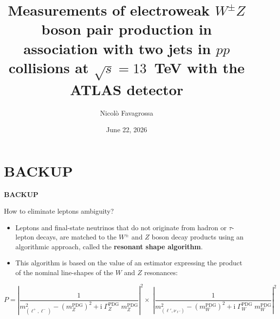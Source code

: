 \documentclass{beamer}
\title{\normalsize Measurements of electroweak $W^{\pm}Z$  boson pair production in association with two jets in $pp$ collisions at $\sqrt{s} = 13$~TeV with the ATLAS detector\\}
\author{Nicolò Favagrossa}
\date{June 22, 2026}
\begin{document}
\maketitle
    




\backmatter
\appendix
\section*{BACKUP}
\begin{frame}[noframenumbering]
    \begin{center}
        \Huge \textbf{BACKUP}
    \end{center}
\end{frame}

\begin{frame}[noframenumbering]{How to eliminate leptons ambiguity?}
    \begin{itemize}
        \item Leptons and final-state neutrinos that do not originate from hadron or $\tau$-lepton decays, are matched to the $W^\pm$ and $Z$ boson decay products using an algorithmic approach, called the \textbf{resonant shape algorithm}. 
        \item This algorithm is based on the value of an estimator expressing the product of the nominal line-shapes of the $W$ and $Z$ resonances:
    \end{itemize}
   
    \vspace{0.4cm} %

    \begin{equation*}
    P = \left| \frac{1}{ m^2_{(\ell^+,\ell^-)} - \left(m_Z^{\textrm{PDG}}\right)^2 + \textrm{i} \; \Gamma_Z^{\textrm{PDG}} \; m_Z^{\textrm{PDG}} } \right|^2  \times \; \left| \frac{1}{ m^2_{(\ell',\nu_{\ell'})} - \left(m_W^{\textrm{PDG}}\right)^2 + \textrm{i} \; \Gamma_W^{\textrm{PDG}} \; m_W^{\textrm{PDG}} } \right|^2 
\end{equation*}
\end{frame}
\end{document}
